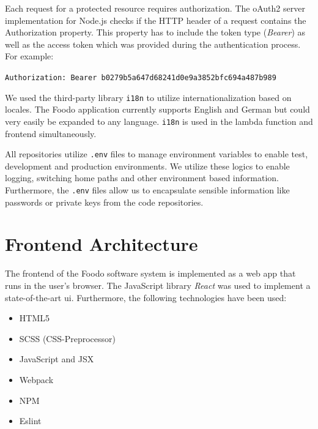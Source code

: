
Each request for a protected resource requires authorization. The oAuth2 server implementation for Node.js checks if the HTTP header of a request contains the Authorization property. This property has to include the token type (\textit{Bearer}) as well as the access token which was provided during the authentication process. For example: \vspace{-1.5em}
\begin{center}
	\texttt{Authorization: Bearer b0279b5a647d68241d0e9a3852bfc694a487b989}
\end{center}


We used the third-party library \texttt{i18n} to utilize internationalization based on locales. The Foodo application currently supports English and German but could very easily be expanded to any language. \texttt{i18n} is used in the lambda function and frontend simultaneously. 


All repositories utilize \texttt{.env} files to manage environment variables to enable test, development and production environments. We utilize these logics to enable logging, switching home paths and other environment based information. Furthermore, the \texttt{.env} files allow us to encapsulate sensible information like passwords or private keys from the code repositories.

\section{Frontend Architecture}

The frontend of the Foodo software system is implemented as a web app that runs in the user’s browser. The JavaScript library \textit{React} was used to implement a state-of-the-art \gls{ui}. Furthermore, the following technologies have been used:

\begin{itemize}
		\itemsep-0.5em
	\item HTML5
	\item SCSS (CSS-Preprocessor)
	\item JavaScript and JSX
	\item Webpack 
	\item NPM
	\item Eslint
\end{itemize}

